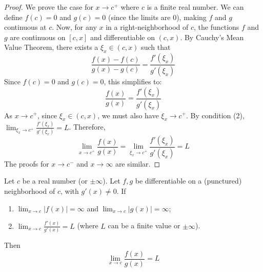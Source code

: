 \begin{proof}
We prove the case for $x \to c^+$ where $c$ is a finite real number.
We can define $f(c) = 0$ and $g(c) = 0$ (since the limits are 0), making $f$ and $g$ continuous at $c$.
Now, for any $x$ in a right-neighborhood of $c$, the functions $f$ and $g$ are continuous on $[c, x]$ and differentiable on $(c, x)$.
By Cauchy's Mean Value Theorem, there exists a $\xi_x \in (c, x)$ such that
\[
\frac{f(x) - f(c)}{g(x) - g(c)} = \frac{f'(\xi_x)}{g'(\xi_x)}
\]
Since $f(c)=0$ and $g(c)=0$, this simplifies to:
\[
\frac{f(x)}{g(x)} = \frac{f'(\xi_x)}{g'(\xi_x)}
\]
As $x \to c^+$, since $\xi_x \in (c, x)$, we must also have $\xi_x \to c^+$.
By condition (2), $\lim_{\xi_x \to c^+} \frac{f'(\xi_x)}{g'(\xi_x)} = L$.
Therefore,
\[
\lim_{x \to c^+} \frac{f(x)}{g(x)} = \lim_{\xi_x \to c^+} \frac{f'(\xi_x)}{g'(\xi_x)} = L
\]
The proofs for $x \to c^-$ and $x \to \infty$ are similar.
\end{proof}



\begin{theorem}
\label{thm:lhopital_inf_en}
Let $c$ be a real number (or $\pm\infty$). Let $f, g$ be differentiable on a (punctured) neighborhood of $c$, with $g'(x) \neq 0$.
If
\begin{enumerate}
    \item $\lim_{x \to c} |f(x)| = \infty$ and $\lim_{x \to c} |g(x)| = \infty$;
    \item $\lim_{x \to c} \frac{f'(x)}{g'(x)} = L$ (where $L$ can be a finite value or $\pm\infty$).
\end{enumerate}
Then
\[
\lim_{x \to c} \frac{f(x)}{g(x)} = L
\]
\end{theorem}

